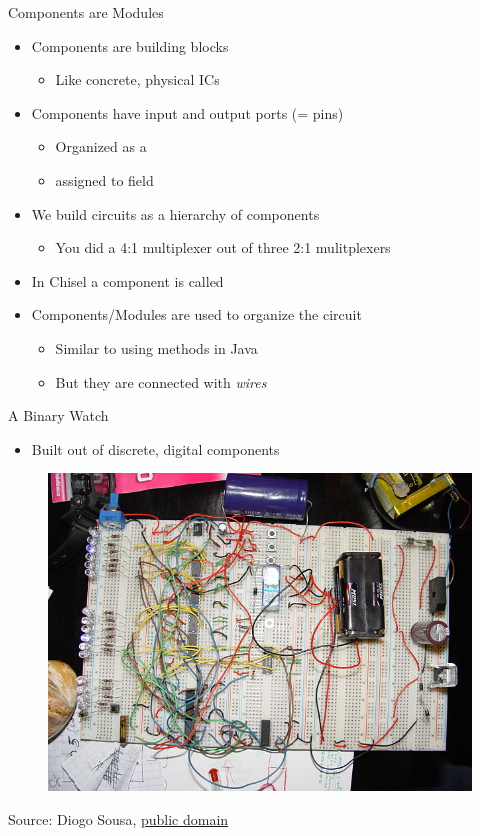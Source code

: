 \begin{frame}[fragile]{Components are Modules}
\begin{itemize}
\item Components are building blocks
\begin{itemize}
\item Like concrete, physical ICs
\end{itemize}
\item Components have input and output ports (= pins)
\begin{itemize}
\item Organized as a 
\item assigned to field 
\end{itemize}
\item We build circuits as a hierarchy of components
\begin{itemize}
\item You did a 4:1 multiplexer out of three 2:1 mulitplexers
\end{itemize}
\item In Chisel a component is called 
\item Components/Modules are used to organize the circuit
\begin{itemize}
\item Similar to using methods in Java
\item But they are connected with \emph{wires}
\end{itemize}
\end{itemize}
\end{frame}


\begin{frame}[fragile]{A Binary Watch}
\begin{itemize}
\item Built out of discrete, digital components
\end{itemize}
\begin{figure}
    \centering
    \href{https://commons.wikimedia.org/wiki/File:Relogio_binario.JPG}{\includegraphics[scale=0.3]{binary-watch.jpg}}
\end{figure}

{\tiny Source: Diogo Sousa, \href{https://en.wikipedia.org/wiki/Public_domain}{public domain}}
\end{frame}


